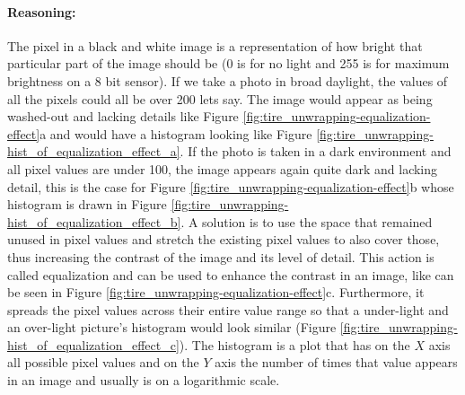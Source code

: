 \paragraph*{Reasoning:}\mbox{}\par
The pixel in a black and white image is a representation of how bright that particular part of the image should be (0 is for no light and 255 is for maximum brightness on a 8 bit sensor). If we take a photo in broad daylight, the values of all the pixels could all be over 200 lets say. The image would appear as being washed-out and lacking details like Figure \ref{fig:tire_unwrapping-equalization-effect}a and would have a histogram looking like Figure \ref{fig:tire_unwrapping-hist_of_equalization_effect_a}. If the photo is taken in a dark environment and all pixel values are under 100, the image appears again quite dark and lacking detail, this is the case for Figure \ref{fig:tire_unwrapping-equalization-effect}b whose histogram is drawn in Figure \ref{fig:tire_unwrapping-hist_of_equalization_effect_b}. A solution is to use the space that remained unused in pixel values and stretch the existing pixel values to also cover those, thus increasing the contrast of the image and its level of detail. This action is called equalization and can be used to enhance the contrast in an image, like can be seen in Figure \ref{fig:tire_unwrapping-equalization-effect}c. Furthermore, it spreads the pixel values across their entire value range so that a under-light and an over-light picture's histogram would look similar (Figure \ref{fig:tire_unwrapping-hist_of_equalization_effect_c}). The histogram is a plot that has on the $X$ axis all possible pixel values and on the $Y$ axis the number of times that value appears in an image and usually is on a logarithmic scale.

